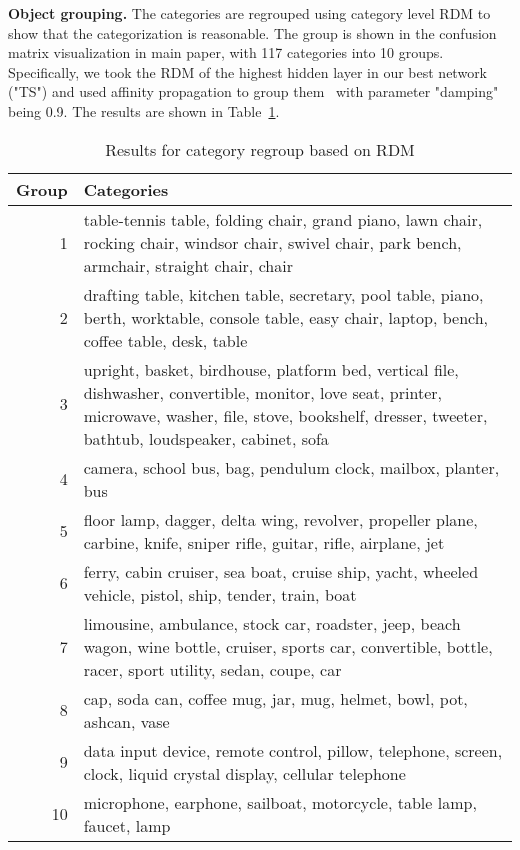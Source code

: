\textbf{Object grouping.} The categories are regrouped using category level RDM to show that the categorization is reasonable. 
The group is shown in the confusion matrix visualization in main paper, with 117 categories into 10 groups.
Specifically, we took the RDM of the highest hidden layer in our best network ("TS") and used affinity propagation to group them~\cite{frey2007clustering} with parameter "damping" being 0.9.
The results are shown in Table~\ref{tab:cat_regruop}.

\begin{table}[h]
\caption{Results for category regroup based on RDM} %
\centering %
\begin{tabularx}{\textwidth}{r|X}
\hline\hline
Group & Categories\\ [0.5ex]
\hline
1 & table-tennis table, folding chair, grand piano, lawn chair, rocking chair, windsor chair, swivel chair, park bench, armchair, straight chair, chair\\
\hline
2 & drafting table, kitchen table, secretary, pool table, piano, berth, worktable, console table, easy chair, laptop, bench, coffee table, desk, table\\
\hline
3 & upright, basket, birdhouse, platform bed, vertical file, dishwasher, convertible, monitor, love seat, printer, microwave, washer, file, stove, bookshelf, dresser, tweeter, bathtub, loudspeaker, cabinet, sofa\\
\hline
4 & camera, school bus, bag, pendulum clock, mailbox, planter, bus\\
\hline
5 & floor lamp, dagger, delta wing, revolver, propeller plane, carbine, knife, sniper rifle, guitar, rifle, airplane, jet\\
\hline
6 & ferry, cabin cruiser, sea boat, cruise ship, yacht, wheeled vehicle, pistol, ship, tender, train, boat\\
\hline
7 & limousine, ambulance, stock car, roadster, jeep, beach wagon, wine bottle, cruiser, sports car, convertible, bottle, racer, sport utility, sedan, coupe, car\\
\hline
8 & cap, soda can, coffee mug, jar, mug, helmet, bowl, pot, ashcan, vase\\
\hline
9 & data input device, remote control, pillow, telephone, screen, clock, liquid crystal display, cellular telephone\\
\hline
10 & microphone, earphone, sailboat, motorcycle, table lamp, faucet, lamp\\
\hline
\end{tabularx}
\label{tab:cat_regruop}
\end{table}

